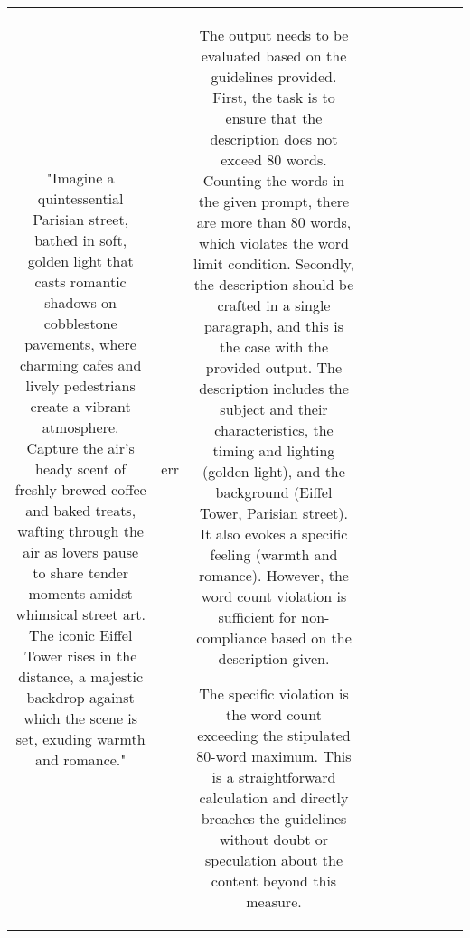 \begin{table}[h!]
\begin{tabular}{|c|c|c|c|c|c|c|c|c|c|}
"Imagine a quintessential Parisian street, bathed in soft, golden light that casts romantic shadows on cobblestone pavements, where charming cafes and lively pedestrians create a vibrant atmosphere. Capture the air's heady scent of freshly brewed coffee and baked treats, wafting through the air as lovers pause to share tender moments amidst whimsical street art. The iconic Eiffel Tower rises in the distance, a majestic backdrop against which the scene is set, exuding warmth and romance." & err & The output needs to be evaluated based on the guidelines provided. First, the task is to ensure that the description does not exceed 80 words. Counting the words in the given prompt, there are more than 80 words, which violates the word limit condition. Secondly, the description should be crafted in a single paragraph, and this is the case with the provided output. The description includes the subject and their characteristics, the timing and lighting (golden light), and the background (Eiffel Tower, Parisian street). It also evokes a specific feeling (warmth and romance). However, the word count violation is sufficient for non-compliance based on the description given.

The specific violation is the word count exceeding the stipulated 80-word maximum. This is a straightforward calculation and directly breaches the guidelines without doubt or speculation about the content beyond this measure.


\end{tabular}
\end{table}
